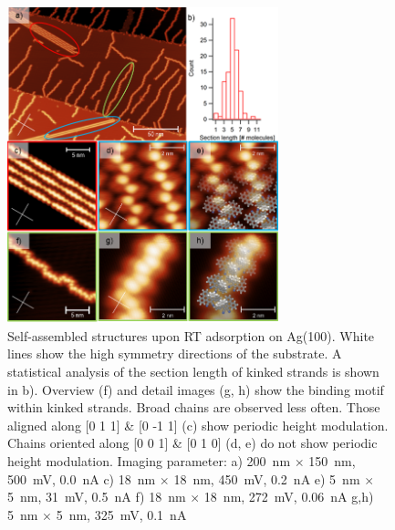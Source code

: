 \begin{figure} \centering
	\includegraphics[width=0.7\textwidth]{./images/paper/helicene/fig3}
	\caption{Self-assembled structures upon RT adsorption on Ag(100). White lines show the high symmetry directions of the substrate. A statistical analysis of the section length of kinked strands is shown in b). Overview (f) and detail images (g, h) show the binding motif within kinked strands. Broad chains are observed less often. Those aligned along [0 1 1] \& [0 -1 1] (c) show periodic height modulation. Chains oriented along [0 0 1] \& [0 1 0] (d, e) do not show periodic height modulation. Imaging parameter: 
		a) %
		\SI{200}{\nano \meter} $\times$ \SI{150}{\nano \meter},
		\SI{500}{\milli \volt}, \SI{0.0}{\nano \ampere} 
		c) %
		\SI{18}{\nano \meter} $\times$ \SI{18}{\nano \meter},
		\SI{450}{\milli \volt}, \SI{0.2}{\nano \ampere} 
		e) %
		\SI{5}{\nano \meter} $\times$ \SI{5}{\nano \meter},
		\SI{31}{\milli \volt}, \SI{0.5}{\nano \ampere}  
		f) %
		\SI{18}{\nano \meter} $\times$ \SI{18}{\nano \meter},
		\SI{272}{\milli \volt}, \SI{0.06}{\nano \ampere}  
		g,h) %
		\SI{5}{\nano \meter} $\times$ \SI{5}{\nano \meter},
		\SI{325}{\milli \volt}, \SI{0.1}{\nano \ampere} 
	}
	\label{fig:hel-fig3}
\end{figure}

